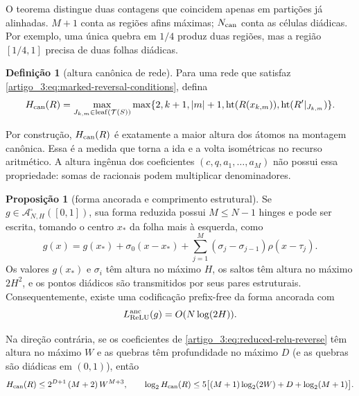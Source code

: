 \documentclass[12pt,a4paper]{article}
\theoremstyle{preciso}
\theoremstyle{definition}
\newcommand{\Aclass}{\mathcal{A}}
\newcommand{\height}{\operatorname{ht}}
\theoremstyle{preciso}
\theoremstyle{preciso}
\theoremstyle{preciso}
\newtheorem{proposition}[teorema]{Proposição}
\theoremstyle{preciso}
\theoremstyle{definition}
\newtheorem{definition}[teorema]{Definição}
\theoremstyle{preciso}
\theoremstyle{definition}
\theoremstyle{preciso}
\theoremstyle{preciso}
\theoremstyle{definition}
\begin{document}
O teorema distingue duas contagens que coincidem apenas em partições já
alinhadas. $M+1$ conta as regiões afins máximas; $N_{\rm can}$ conta as células
diádicas. Por exemplo, uma única quebra em $1/4$ produz duas regiões, mas a
região $[1/4,1]$ precisa de duas folhas diádicas.

\begin{definition}[altura canônica de rede]\label{map:artigo_3:5.3}
\label{artigo_3:def:canonical-network-height}
Para uma rede que satisfaz \eqref{artigo_3:eq:marked-reversal-conditions}, defina
\begin{equation}
 H_{\rm can}(R)=
 \max_{J_{k,m}\in\operatorname{leaf}(\mathcal T(S))}
 \max\{2,k+1,|m|+1,\height(R(x_{k,m})),\height(R'|_{J_{k,m}})\}.
 \label{artigo_3:eq:canonical-network-height}
\end{equation}
\end{definition}

Por construção, $H_{\rm can}(R)$ é exatamente a maior altura dos átomos na
montagem canônica. Essa é a medida que torna a ida e a volta isométricas no
recurso aritmético. A altura ingênua dos coeficientes
$(c,q,a_1,\ldots,a_M)$ não possui essa propriedade: somas de racionais podem
multiplicar denominadores.

\begin{proposition}[forma ancorada e comprimento estrutural]\label{map:artigo_3:5.4}
\label{artigo_3:prop:anchored-relu-code}
Se $g\in\Aclass^\square_{N,H}([0,1])$, sua forma reduzida possui
$M\le N-1$ hinges e pode ser escrita, tomando o centro $x_*$ da folha mais à
esquerda, como
\begin{equation}
 g(x)=g(x_*)+\sigma_0(x-x_*)
      +\sum_{j=1}^{M}(\sigma_j-\sigma_{j-1})\rho(x-\tau_j).
 \label{artigo_3:eq:anchored-relu-form}
\end{equation}
Os valores $g(x_*)$ e $\sigma_i$ têm altura no máximo $H$, os saltos têm
altura no máximo $2H^2$, e os pontos diádicos são transmitidos por seus pares
estruturais. Consequentemente, existe uma codificação prefix-free da forma
ancorada com
\begin{equation}
 L_{\rm ReLU}^{\rm anc}(g)=O(N\log(2H)).
 \label{artigo_3:eq:anchored-network-bits}
\end{equation}

Na direção contrária, se os coeficientes de
\eqref{artigo_3:eq:reduced-relu-reverse} têm altura no máximo $W$ e as quebras têm
profundidade no máximo $D$ (e as quebras são diádicas em $(0,1)$), então
\begin{equation}
 H_{\rm can}(R)\le 2^{D+1}\,(M+2)\,W^{M+3},
 \qquad
 \log_2 H_{\rm can}(R)
 \le 5\bigl[(M+1)\log_2(2W)+D+\log_2(M+1)\bigr].
 \label{artigo_3:eq:reverse-height-bit-bound}
\end{equation}
\end{proposition}
\end{document}
